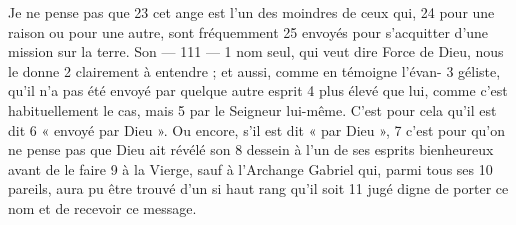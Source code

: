 Je ne pense pas que	 
23	 	cet ange est l'un des moindres de ceux qui,	 
24	 	pour une raison ou pour une autre, sont fréquemment	 
25	 	envoyés pour s'acquitter d'une mission sur la terre. Son	 
 	--- 111 ---	 
1	 	nom seul, qui veut dire Force de Dieu, nous le donne	 
2	 	clairement à entendre ; et aussi, comme en témoigne l'évan-	 
3	 	géliste, qu'il n'a pas été envoyé par quelque autre esprit	 
4	 	plus élevé que lui, comme c'est habituellement le cas, mais	 
5	 	par le Seigneur lui-même. C'est pour cela qu'il est dit	 
6	 	« envoyé par Dieu ». Ou encore, s'il est dit « par Dieu »,	 
7	 	c'est pour qu'on ne pense pas que Dieu ait révélé son	 
8	 	dessein à l'un de ses esprits bienheureux avant de le faire	 
9	 	à la Vierge, sauf à l'Archange Gabriel qui, parmi tous ses	 
10	 	pareils, aura pu être trouvé d'un si haut rang qu'il soit	 
11	 	jugé digne de porter ce nom et de recevoir ce message.